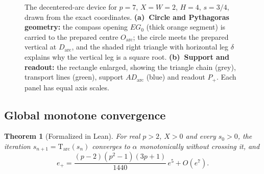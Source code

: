 \documentclass[10pt,a4paper]{article}
\theoremstyle{plain}
\newtheorem{theorem}{Theorem}[section]
\theoremstyle{remark}
\numberwithin{equation}{section}
\newcommand{\Tm}{\mathrm{T}}
\begin{document}
\begin{figure}[htbp]
\centering\figDecentered
\caption{The decentered-arc device for $p=7$, $X=W=2$, $H=4$, $s=3/4$, drawn from the exact coordinates.
\textbf{(a)~Circle and Pythagoras geometry:} the compass opening $EG_0$ (thick orange segment) is carried
to the prepared centre $O_{\mathrm{arc}}$; the circle meets the prepared vertical at $D_{\mathrm{arc}}$,
and the shaded right triangle with horizontal leg $\delta$ explains why the vertical leg is a square root.
\textbf{(b)~Support and readout:} the rectangle enlarged, showing the triangle chain (grey), transport
lines (green), support $AD_{\mathrm{arc}}$ (blue) and readout $P_+$. Each panel has equal axis
scales.}\label{fig:arc}
\end{figure}

\subsection{Global monotone convergence}

\begin{theorem}[Formalized in Lean]\label{thm:arc}
For real $p>2$, $X>0$ and every $s_0>0$, the iteration $s_{n+1}=\Tm_{\mathrm{arc}}(s_n)$ converges to
$\alpha$ monotonically without crossing it, and
\begin{equation}\label{eq:arc-order}
e_+=\frac{(p-2)(p^{2}-1)(3p+1)}{1440}\,e^{5}+O(e^{7}).
\end{equation}
\end{theorem}
\end{document}
